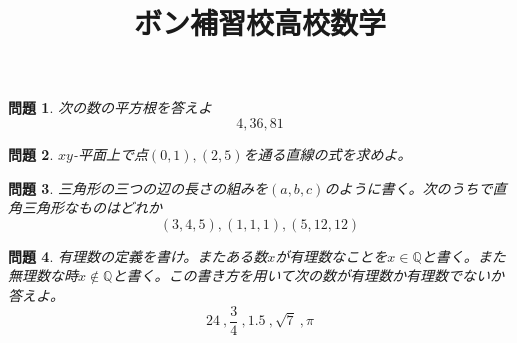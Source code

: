 \documentclass{ltjsarticle}
\title{ボン補習校高校数学}
\author{}
\date{}
\newtheorem{problem}{問題}
\begin{document}
\maketitle
\begin{problem}
次の数の平方根を答えよ
\begin{equation*}
4, 36, 81
\end{equation*}
\end{problem}

\begin{problem}
$xy$-平面上で点$(0,1),(2,5)$を通る直線の式を求めよ。
\end{problem}

\begin{problem}
三角形の三つの辺の長さの組みを$(a,b,c)$のように書く。次のうちで直角三角形なものはどれか
\begin{equation*}
(3,4,5),(1,1,1),(5,12,12)
\end{equation*}
\end{problem}

\begin{problem}
有理数の定義を書け。またある数$x$が有理数なことを$x\in \mathbb{Q}$と書く。また無理数な時$x\not\in \mathbb{Q}$と書く。この書き方を用いて次の数が有理数か有理数でないか答えよ。
\begin{equation*}
24\:, {\frac 3 4}\:, 1.5\:, \sqrt{7}\:,\pi
\end{equation*}
\end{problem}
\end{document}
